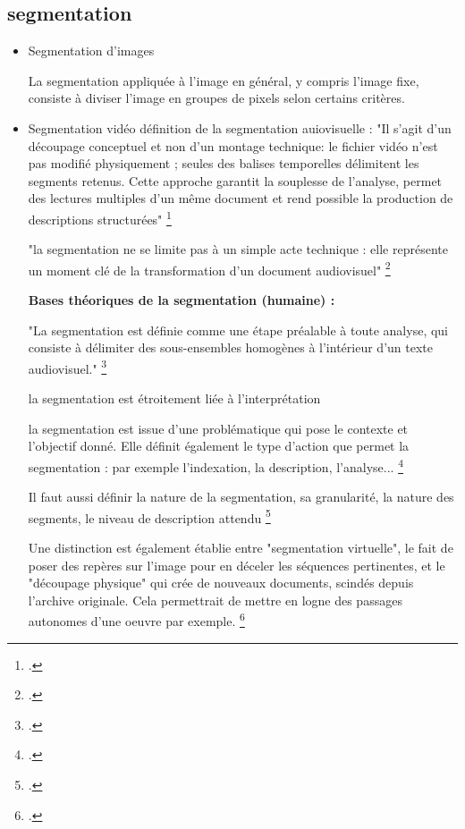 \subsection{segmentation}

\begin{itemize}

\item Segmentation d'images

La segmentation appliquée à l'image en général, y compris l'image fixe, consiste à diviser l'image en groupes de pixels selon certains critères. 

\item Segmentation vidéo
définition de la segmentation auiovisuelle : 
"Il s’agit d’un découpage conceptuel et non d’un montage technique: le fichier vidéo n’est pas modifié physiquement ; seules des balises temporelles délimitent les segments retenus.
Cette approche garantit la souplesse de l’analyse, permet des lectures multiples d’un même document et rend possible la production de descriptions structurées" \footcite{stockinger2011}

"la segmentation ne se limite pas à un simple acte technique : elle représente un moment clé de la transformation d’un document audiovisuel" \footcite{stockinger2011}

\textbf{Bases théoriques de la segmentation (humaine) :}

"La segmentation est définie comme une étape préalable à toute analyse, qui consiste à délimiter des sous-ensembles homogènes à l’intérieur d’un texte audiovisuel." \footcite{stockinger2011}

la segmentation est étroitement liée à l'interprétation

la segmentation est issue d'une problématique qui pose le contexte et l'objectif donné. Elle définit également le type d'action que permet la segmentation : par exemple l'indexation, la description, l'analyse... \footcite{stockinger2011}

Il faut aussi définir la nature de la segmentation, sa granularité, la nature des segments, le niveau de description attendu \footcite{stockinger2011}

Une distinction est également établie entre "segmentation virtuelle", le fait de poser des repères sur l'image pour en déceler les séquences pertinentes, et le "découpage physique" qui crée de nouveaux documents, scindés depuis l'archive originale. Cela permettrait de mettre en logne des passages autonomes d'une oeuvre par exemple. \footcite{stockinger2011}


\end{itemize}
